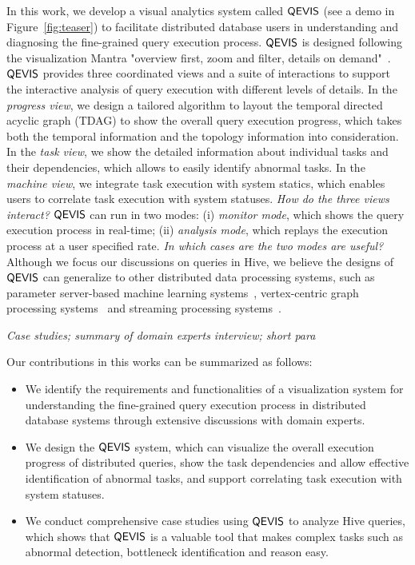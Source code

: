 In this work, we develop a visual analytics system called $\mathsf{QEVIS}$ (see a demo in Figure~\ref{fig:teaser}) to facilitate distributed database users in understanding and diagnosing the fine-grained query execution process. $\mathsf{QEVIS}$ is designed following the visualization Mantra "overview first, zoom and filter, details on demand"~\cite{shneiderman2003eyes}. $\mathsf{QEVIS}$ provides three coordinated views and a suite of interactions to support the interactive analysis of query execution with different levels of details. In the \textit{progress view}, we design a tailored algorithm to layout the temporal directed acyclic graph (TDAG) to show the overall query execution progress, which takes both the temporal information and the topology information into consideration. In the \textit{task view}, we show the detailed information about individual tasks and their dependencies, which allows to easily identify abnormal tasks. In the \textit{machine view}, we integrate task execution with system statics, which enables users to correlate task execution with system statuses.\textit{ How do the three views interact?}
$\mathsf{QEVIS}$ can run in two modes: (i) \textit{monitor mode}, which shows the query execution process in real-time; (ii) \textit{analysis mode}, which replays the execution process at a user specified rate. \textit{ In which cases are the two modes are useful?} Although we focus our discussions on queries in Hive, we believe the designs of $\mathsf{QEVIS}$ can generalize to other distributed data processing systems, such as parameter server-based machine learning systems~\cite{}, vertex-centric graph processing systems~\cite{} and streaming processing systems~\cite{carbone2015apache}.   

\textit{Case studies; summary of domain experts interview; short para}

Our contributions in this works can be summarized as follows:
\begin{itemize}
	\item We identify the requirements and functionalities of a visualization system for understanding the fine-grained query execution process in distributed database systems through extensive discussions with domain experts.   
	\item We design the $\mathsf{QEVIS}$ system, which can visualize the overall execution progress of distributed queries, show the task dependencies and allow effective identification of abnormal tasks, and support correlating task execution with system statuses.
	\item We conduct comprehensive case studies using $\mathsf{QEVIS}$ to analyze Hive queries, which shows that $\mathsf{QEVIS}$ is a valuable tool that makes complex tasks such as abnormal detection, bottleneck identification and reason easy.
\end{itemize}


